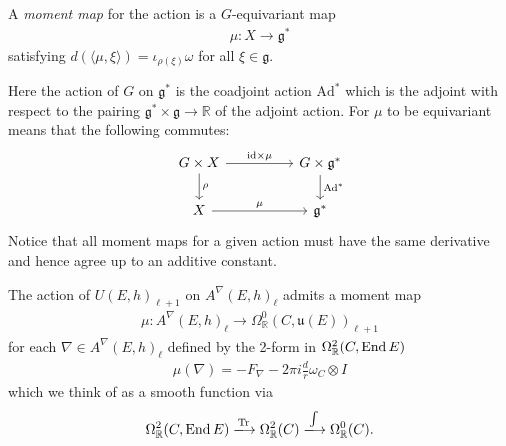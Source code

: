 \documentclass[12pt]{ociamthesis}  %
\begin{document}
\begin{definition}
  A \emph{moment map} for the action is a $G$-equivariant map
  \begin{align*}
    \mu : X \to \mathfrak g^*
  \end{align*}
  satisfying $d(\langle\mu,\xi\rangle)=\iota_{\rho(\xi)}\omega$ for all
  $\xi\in\mathfrak g$.
\end{definition}

Here the action of $G$ on $\mathfrak g^*$ is the coadjoint action
$\text{Ad}^*$ which is the adjoint with respect to the pairing
$\mathfrak g^*\times\mathfrak g\to\mathbb{R}$ of the adjoint action.
For $\mu$ to be equivariant means that the following commutes:
\begin{equation*}
  \begin{tikzcd}
    {G\times X} && {G\times\mathfrak g^*} \\
    X && {\mathfrak g^*}
    \arrow["{\text{id}\times\mu}", from=1-1, to=1-3]
    \arrow["\rho", from=1-1, to=2-1]
    \arrow["{\text{Ad}^*}", from=1-3, to=2-3]
    \arrow["\mu", from=2-1, to=2-3]
  \end{tikzcd}
\end{equation*}
Notice that all moment maps for a given action must have the same derivative and hence
agree up to an additive constant.

\begin{example}
  The action of $U(E,h)_{\ell+1}$ on $A^\nabla(E,h)_\ell$ admits a moment map
  \begin{align*}
    \mu : A^\nabla(E,h)_\ell \to \Omega^0_{\mathbb{R}}(C,\mathfrak u(E))_{\ell+1}
  \end{align*}
  for each $\nabla\in A^\nabla(E,h)_\ell$ defined by the 2-form in
  $\Omega^2_{\mathbb{R}}(C,\operatorname{End} E)$
  \begin{align*}
    \mu(\nabla) = - F_\nabla - 2\pi i \frac{d}{r} \omega_C\otimes I
  \end{align*}
  which we think of as a smooth function via
  \begin{align*}
   \Omega^2_{\mathbb{R}}(C,\End E) \xlongrightarrow{\Tr}
   \Omega^2_{\mathbb{R}}(C) \xlongrightarrow{\int}
   \Omega^0_{\mathbb{R}}(C).
  \end{align*}
\end{example}
\end{document}
